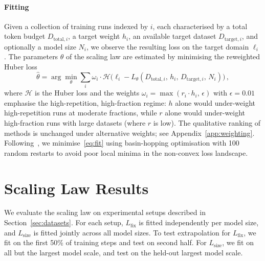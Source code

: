 \paragraph{Fitting}
Given a collection of training runs indexed by $i$, each characterised by a total token budget $D_{\text{total},i}$, a target weight $h_i$, an available target dataset $D_{\text{target},i}$, and optionally a model size $N_i$, we observe the resulting loss on the target domain $\ell_i$.
The parameters $\theta$ of the scaling law are estimated by minimising the reweighted Huber loss
\begin{equation}\label{eq:fit}
  \hat\theta = \arg\min_\theta \sum_i \omega_i \cdot \mathcal{H}\!\bigl(\ell_i - L_\theta(D_{\text{total},i},\, h_i,\, D_{\text{target},i},\, N_i)\bigr)\,,
\end{equation}
where $\mathcal{H}$ is the Huber loss and the weights $\omega_i = \max(r_i \cdot h_i,\, \epsilon)$ with $\epsilon=0.01$ emphasise the high-repetition, high-fraction regime: $h$ alone would under-weight high-repetition runs at moderate fractions, while $r$ alone would under-weight high-fraction runs with large datasets (where $r$ is low).
The qualitative ranking of methods is unchanged under alternative weights; see Appendix~\ref{app:weighting}.
Following~\citet{shukor2025scalinglawsoptimaldata}, we minimise~\ref{eq:fit} using basin-hopping optimisation with 100 random restarts to avoid poor local minima in the non-convex loss landscape.


\section{Scaling Law Results}
\label{sec:scaling_results}
We evaluate the scaling law on experimental setups described in Section~\ref{sec:datasets}.
For each setup, $L_\mathrm{fix}$ is fitted independently per model size, and $L_\mathrm{size}$ is fitted jointly across all model sizes.
To test extrapolation for $L_\mathrm{fix}$, we fit on the first 50\% of training steps and test on second half. For $L_\mathrm{size}$, we fit on all but the largest model scale, and test on the held-out largest model scale.


